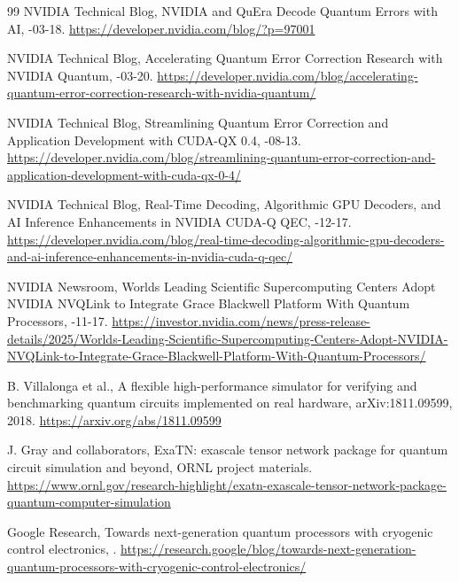 \documentclass[11pt,a4paper]{article}
\begin{document}
\begin{thebibliography}{99}
NVIDIA Technical Blog,
\newblock NVIDIA and QuEra Decode Quantum Errors with AI,
-03-18.
\newblock \url{https://developer.nvidia.com/blog/?p=97001}

NVIDIA Technical Blog,
\newblock Accelerating Quantum Error Correction Research with NVIDIA Quantum,
-03-20.
\newblock \url{https://developer.nvidia.com/blog/accelerating-quantum-error-correction-research-with-nvidia-quantum/}

NVIDIA Technical Blog,
\newblock Streamlining Quantum Error Correction and Application Development with CUDA-QX 0.4,
-08-13.
\newblock \url{https://developer.nvidia.com/blog/streamlining-quantum-error-correction-and-application-development-with-cuda-qx-0-4/}

NVIDIA Technical Blog,
\newblock Real-Time Decoding, Algorithmic GPU Decoders, and AI Inference Enhancements in NVIDIA CUDA-Q QEC,
-12-17.
\newblock \url{https://developer.nvidia.com/blog/real-time-decoding-algorithmic-gpu-decoders-and-ai-inference-enhancements-in-nvidia-cuda-q-qec/}

NVIDIA Newsroom,
\newblock Worlds Leading Scientific Supercomputing Centers Adopt NVIDIA NVQLink to Integrate Grace Blackwell Platform With Quantum Processors,
-11-17.
\newblock \url{https://investor.nvidia.com/news/press-release-details/2025/Worlds-Leading-Scientific-Supercomputing-Centers-Adopt-NVIDIA-NVQLink-to-Integrate-Grace-Blackwell-Platform-With-Quantum-Processors/}

B. Villalonga et al.,
\newblock A flexible high-performance simulator for verifying and benchmarking quantum circuits implemented on real hardware,
\newblock arXiv:1811.09599, 2018.
\newblock \url{https://arxiv.org/abs/1811.09599}

J. Gray and collaborators,
\newblock ExaTN: exascale tensor network package for quantum circuit simulation and beyond,
\newblock ORNL project materials.
\newblock \url{https://www.ornl.gov/research-highlight/exatn-exascale-tensor-network-package-quantum-computer-simulation}

Google Research,
\newblock Towards next-generation quantum processors with cryogenic control electronics,
.
\newblock \url{https://research.google/blog/towards-next-generation-quantum-processors-with-cryogenic-control-electronics/}


\end{thebibliography}
\end{document}
